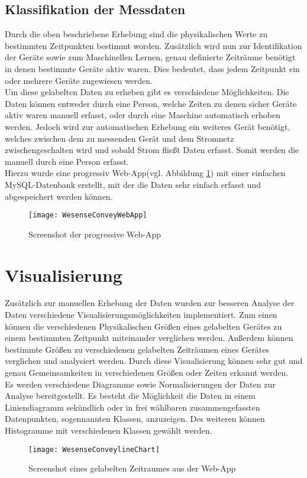     \subsection{Klassifikation der Messdaten}
        
        Durch die oben beschriebene Erhebung sind die physikalischen Werte zu bestimmten Zeitpunkten bestimmt worden.
        Zusätzlich wird nun zur Identifikation der Geräte sowie zum Maschinellen Lernen, genau definierte Zeiträume benötigt in denen bestimmte Geräte aktiv waren.
        Dies bedeutet, dass jedem Zeitpunkt ein oder mehrere Geräte zugewiesen werden. \\
        \newline
        Um diese gelabelten Daten zu erheben gibt es verschiedene Möglichkeiten.
        Die Daten können entweder durch eine Person, welche Zeiten zu denen sicher Geräte aktiv waren manuell erfasst, oder durch eine Maschine automatisch erhoben werden.
        Jedoch wird zur automatischen Erhebung ein weiteres Gerät benötigt, welches zwischen dem zu messenden Gerät und dem Stromnetz zwischengeschalten wird und sobald Strom fließt Daten erfasst.
        Somit werden die manuell durch eine Person erfasst.\\
        \newline
        Hierzu wurde eine progressiv Web-App(vgl. Abbildung \ref{fig:WebApp1}) mit einer einfachen MySQL-Datenbank erstellt, mit der die Daten sehr einfach erfasst und abgespeichert werden können.

        \begin{figure}[h]
            \centering
            \texttt{[image: WesenseConveyWebApp]}
            \caption{Screenshot der progressive Web-App}
            \label{fig:WebApp1}
        \end{figure}
    
\section{Visualisierung}\label{VisualisierungWebApp}

        Zusätzlich zur manuellen Erhebung der Daten wurden zur besseren Analyse der Daten verschiedene Visualisierungsmöglichkeiten implementiert.
        Zum einen können die verschiedenen Physikalischen Größen eines gelabelten Gerätes zu einem bestimmten Zeitpunkt miteinander verglichen werden.
        Außerdem können bestimmte Größen zu verschiedenen gelabelten Zeiträumen eines Gerätes verglichen und analysiert werden. 
        Durch diese Visualisierung können sehr gut und genau Gemeinsamkeiten in verschiedenen Größen oder Zeiten erkannt werden.\\
        \newline
        Es werden verschiedene Diagramme sowie Normalisierungen der Daten zur Analyse bereitgestellt.
        Es besteht die Möglichkeit die Daten in einem Liniendiagramm sekündlich oder in frei wählbaren zusammengefassten Datenpunkten, sogennannten Klassen, anzuzeigen.
        Des weiteren können Histogramme mit verschiedenen Klassen gewählt werden.

        \begin{figure}[h]
            \centering
            \texttt{[image: WesenseConveylineChart]}
            \caption{Screenshot eines gelabelten Zeitraumes aus der Web-App}
            \label{fig:WebApp2}
        \end{figure}
        